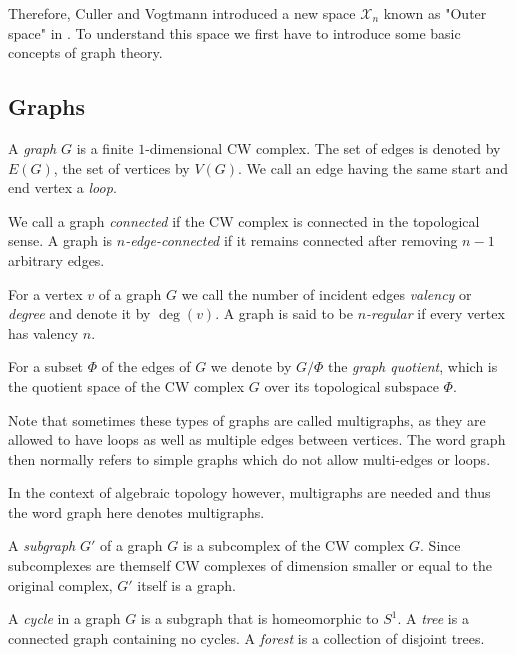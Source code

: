 Therefore, Culler and Vogtmann introduced a new space $\mathcal{X}_{n}$ known as "Outer space" in \cite{vogtmann86}.
To understand this space we first have to introduce some basic concepts of graph theory.

\subsection{Graphs}
\begin{definition}
	A \emph{graph} $G$ is a finite $1$-dimensional CW complex. The set of edges is denoted by $E(G)$, the set of vertices by  $V(G)$.
	We call an edge having the same start and end vertex a \emph{loop}.

	We call a graph \emph{connected} if the CW complex is connected in the topological sense.
	A graph is \emph{$n$-edge-connected} if it remains connected after removing  $n-1$ arbitrary edges.

	For a vertex $v$ of a graph  $G$ we call the number of incident edges \emph{valency} or \emph{degree} and denote it by $\deg(v)$.
	A graph is said to be \emph{$n$-regular} if every vertex has valency $n$.

	For a subset $\Phi$ of the edges of $G$ we denote by $G / \Phi$ the \emph{graph quotient}, which is the quotient space of the CW complex $G$ over its topological subspace $\Phi$.
\end{definition}

\begin{remark}
	Note that sometimes these types of graphs are called multigraphs, as they are allowed to have loops as well as multiple edges between vertices.
	The word graph then normally refers to simple graphs which do not allow multi-edges or loops.

	In the context of algebraic topology however, multigraphs are needed and thus the word graph here denotes multigraphs.
\end{remark}

\begin{definition}
	A \emph{subgraph} $G'$ of a graph $G$ is a subcomplex of the CW complex $G$. Since subcomplexes are themself CW complexes of dimension smaller or equal to the original complex,
	 $G'$ itself is a graph.

	 A \emph{cycle} in a graph $G$ is a subgraph that is homeomorphic to $S^1$. A \emph{tree} is a
	 connected graph containing no cycles. A \emph{forest} is a collection of disjoint trees.
\end{definition}

